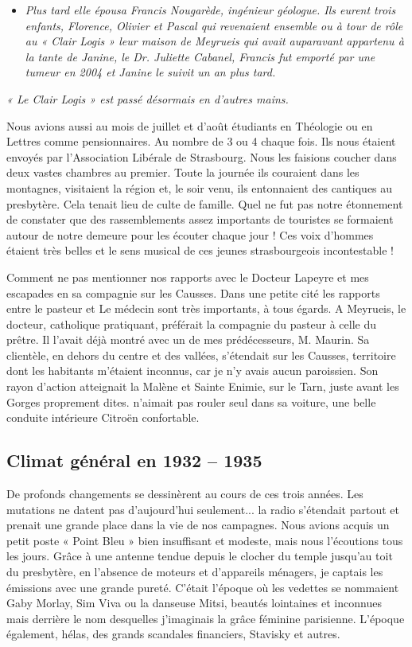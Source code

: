 \begin{itemize}
\item \emph{Plus tard elle épousa Francis Nougarède, ingénieur géologue. Ils eurent trois enfants,
Florence, Olivier et Pascal qui revenaient ensemble ou à tour de rôle au « Clair Logis »
leur maison de Meyrueis qui avait auparavant appartenu à la tante de Janine, le Dr. Juliette
Cabanel,
Francis fut emporté par une tumeur en 2004 et Janine le suivit un an plus tard.}
\end{itemize}

\emph{« Le Clair Logis » est passé désormais en d’autres mains.}

Nous avions aussi au mois de juillet et d’août étudiants en Théologie ou en Lettres
comme pensionnaires. Au nombre de 3 ou 4 chaque fois. Ils nous étaient envoyés par
l’Association Libérale de Strasbourg. Nous les faisions coucher dans deux vastes
chambres au premier. Toute la journée ils couraient dans les montagnes, visitaient la
région et, le soir venu, ils entonnaient des cantiques au presbytère. Cela tenait lieu de
culte de famille. Quel ne fut pas notre étonnement de constater que des
rassemblements assez importants de touristes se formaient autour de notre demeure
pour les écouter chaque jour ! Ces voix d’hommes étaient très belles et le sens musical
de ces jeunes strasbourgeois incontestable !

Comment ne pas mentionner nos rapports avec le Docteur Lapeyre et mes escapades
en sa compagnie sur les Causses. Dans une petite cité les rapports entre le pasteur et
Le médecin sont très importants, à tous égards. A Meyrueis, le docteur, catholique
pratiquant, préférait la compagnie du pasteur à celle du prêtre. Il l’avait déjà montré
avec un de mes prédécesseurs, M. Maurin.
Sa clientèle, en dehors du centre et des vallées, s’étendait sur les Causses, territoire
dont les habitants m’étaient inconnus, car je n’y avais aucun paroissien. Son rayon
d’action atteignait la Malène et Sainte Enimie, sur le Tarn, juste avant les Gorges
proprement dites. n’aimait pas rouler seul dans sa voiture, une belle conduite
intérieure Citroën confortable.


\subsection{Climat général en 1932 -- 1935}

De profonds changements se dessinèrent au cours de ces trois années. Les mutations
ne datent pas d’aujourd’hui seulement... la radio s’étendait partout et prenait une
grande place dans la vie de nos campagnes. Nous avions acquis un petit poste « Point
Bleu » bien insuffisant et modeste, mais nous l’écoutions tous les jours. Grâce à une
antenne tendue depuis le clocher du temple jusqu’au toit du presbytère, en l’absence
de moteurs et d’appareils ménagers, je captais les émissions avec une grande pureté.
C’était l’époque où les vedettes se nommaient Gaby Morlay, Sim Viva ou la
danseuse Mitsi, beautés lointaines et inconnues mais derrière le nom desquelles
j’imaginais la grâce féminine parisienne. L’époque également, hélas, des grands
scandales financiers, Stavisky et autres.

